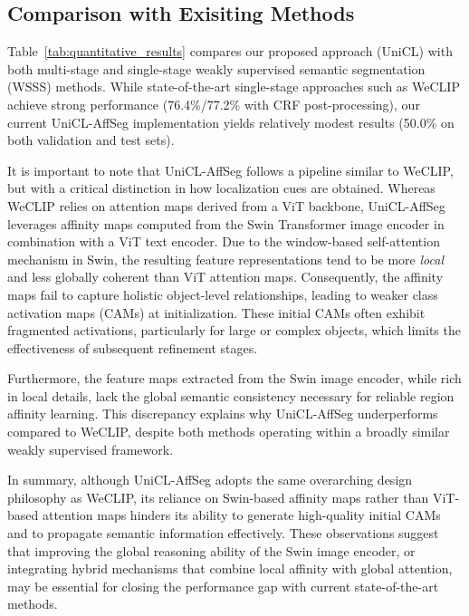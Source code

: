 \subsection{Comparison with Exisiting Methods}
\label{subsec:comparison_with_baseline_methods}
Table~\ref{tab:quantitative_results} compares our proposed approach (UniCL) with both multi-stage and single-stage weakly supervised semantic segmentation (WSSS) methods. While state-of-the-art single-stage approaches such as WeCLIP achieve strong performance (76.4\%/77.2\% with CRF post-processing), our current UniCL-AffSeg implementation yields relatively modest results (50.0\% on both validation and test sets).  

It is important to note that UniCL-AffSeg follows a pipeline similar to WeCLIP, but with a critical distinction in how localization cues are obtained. Whereas WeCLIP relies on attention maps derived from a ViT backbone, UniCL-AffSeg leverages affinity maps computed from the Swin Transformer image encoder in combination with a ViT text encoder. Due to the window-based self-attention mechanism in Swin, the resulting feature representations tend to be more \textit{local} and less globally coherent than ViT attention maps. Consequently, the affinity maps fail to capture holistic object-level relationships, leading to weaker class activation maps (CAMs) at initialization. These initial CAMs often exhibit fragmented activations, particularly for large or complex objects, which limits the effectiveness of subsequent refinement stages.  

Furthermore, the feature maps extracted from the Swin image encoder, while rich in local details, lack the global semantic consistency necessary for reliable region affinity learning. This discrepancy explains why UniCL-AffSeg underperforms compared to WeCLIP, despite both methods operating within a broadly similar weakly supervised framework.  

In summary, although UniCL-AffSeg adopts the same overarching design philosophy as WeCLIP, its reliance on Swin-based affinity maps rather than ViT-based attention maps hinders its ability to generate high-quality initial CAMs and to propagate semantic information effectively. These observations suggest that improving the global reasoning ability of the Swin image encoder, or integrating hybrid mechanisms that combine local affinity with global attention, may be essential for closing the performance gap with current state-of-the-art methods.





